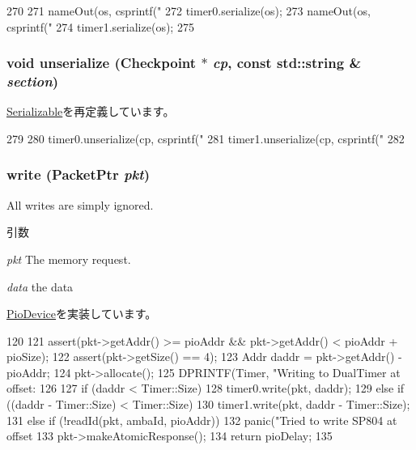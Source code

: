 \begin{DoxyCode}
270 {
271     nameOut(os, csprintf("%
272     timer0.serialize(os);
273     nameOut(os, csprintf("%
274     timer1.serialize(os);
275 }
\end{DoxyCode}
\hypertarget{classSp804_af22e5d6d660b97db37003ac61ac4ee49}{
\subsubsection[{unserialize}]{\setlength{\rightskip}{0pt plus 5cm}void unserialize ({\bf Checkpoint} $\ast$ {\em cp}, \/  const std::string \& {\em section})}}
\label{classSp804_af22e5d6d660b97db37003ac61ac4ee49}


\hyperlink{classSerializable_af100c4e9feabf3cd918619c88c718387}{Serializable}を再定義しています。


\begin{DoxyCode}
279 {
280     timer0.unserialize(cp, csprintf("%
281     timer1.unserialize(cp, csprintf("%
282 }
\end{DoxyCode}
\hypertarget{classSp804_a4cefab464e72b5dd42c003a0a4341802}{
\subsubsection[{write}]{ write ({\bf PacketPtr} {\em pkt})}}
\label{classSp804_a4cefab464e72b5dd42c003a0a4341802}
All writes are simply ignored. 
\begin{DoxyParams}{引数}
\item[{\em pkt}]The memory request. \item[{\em data}]the data \end{DoxyParams}


\hyperlink{classPioDevice_afe8371668d023bb2516b286e5e399b6f}{PioDevice}を実装しています。


\begin{DoxyCode}
120 {
121     assert(pkt->getAddr() >= pioAddr && pkt->getAddr() < pioAddr + pioSize);
122     assert(pkt->getSize() == 4);
123     Addr daddr = pkt->getAddr() - pioAddr;
124     pkt->allocate();
125     DPRINTF(Timer, "Writing to DualTimer at offset: %
126 
127     if (daddr < Timer::Size)
128         timer0.write(pkt, daddr);
129     else if ((daddr - Timer::Size) < Timer::Size)
130         timer1.write(pkt, daddr - Timer::Size);
131     else if (!readId(pkt, ambaId, pioAddr))
132         panic("Tried to write SP804 at offset %
133     pkt->makeAtomicResponse();
134     return pioDelay;
135 }
\end{DoxyCode}


